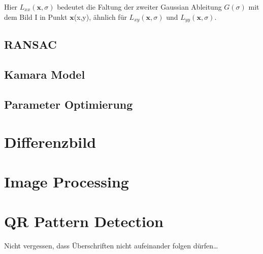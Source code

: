 Hier $L_{xx}(\textbf{x},\sigma)$ bedeutet die Faltung der zweiter Gaussian Ableitung $G(\sigma)$ mit dem Bild I in Punkt $\textbf{x}$(x,y), ähnlich für $L_{xy}(\textbf{x},\sigma)$ und $L_{yy}(\textbf{x},\sigma)$.



\subsection{RANSAC}

\subsection{Kamara Model}

\subsection{Parameter Optimierung}

\section{Differenzbild}


\section{Image Processing} 


\section{QR Pattern Detection} 


Nicht vergessen, dass Überschriften nicht aufeinander folgen dürfen\ldots


